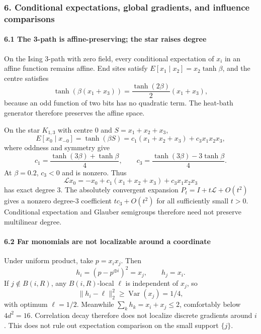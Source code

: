 \subsubsection{6. Conditional expectations, global gradients, and influence comparisons}\label{conditional-expectations-global-gradients-and-influence-comparisons}

\paragraph{6.1 The 3-path is affine-preserving; the star raises degree}\label{the-3-path-is-affine-preserving-the-star-raises-degree}

On the Ising 3-path with zero field, every conditional expectation of \(x_i\) in an affine function remains affine. End sites satisfy \(E[x_1\mid x_2]=x_2\tanh\beta\), and the centre satisfies
\[\tanh(\beta(x_1+x_3))=\frac{\tanh(2\beta)}2(x_1+x_3),\]
because an odd function of two bits has no quadratic term. The heat-bath generator therefore preserves the affine space.

On the star \(K_{1,3}\) with centre \(0\) and \(S=x_1+x_2+x_3\),
\[E[x_0\mid x_{-0}]=\tanh(\beta S)
=c_1(x_1+x_2+x_3)+c_3x_1x_2x_3,\]
where oddness and symmetry give
\[c_1=\frac{\tanh(3\beta)+\tanh\beta}{4},
\qquad
c_3=\frac{\tanh(3\beta)-3\tanh\beta}{4}.\]
At \(\beta=0.2\), \(c_3<0\) and is nonzero. Thus
\[\mathcal Lx_0=-x_0+c_1(x_1+x_2+x_3)+c_3x_1x_2x_3\]
has exact degree \(3\). The absolutely convergent expansion \(P_t=I+t\mathcal L+O(t^2)\) gives a nonzero degree-\(3\) coefficient \(tc_3+O(t^2)\) for all sufficiently small \(t>0\). Conditional expectation and Glauber semigroups therefore need not preserve multilinear degree.

\paragraph{6.2 Far monomials are not localizable around a coordinate}\label{far-monomials-are-not-localizable-around-a-coordinate}

Under uniform product, take \(p=x_ix_j\). Then
\[h_i=(p-p^{\oplus i})^2=x_j,\qquad h_j=x_i.\]
If \(j\notin B(i,R)\), any \(B(i,R)\)-local \(\ell\) is independent of \(x_j\), so
\[\|h_i-\ell\|_2^2\ge\operatorname{Var}(x_j)=1/4,\]
with optimum \(\ell=1/2\). Meanwhile \(\sum_kh_k=x_i+x_j\le2\), comfortably below \(4d^2=16\). Correlation decay therefore does not localize discrete gradients around \(i\). This does not rule out expectation comparison on the small support \(\{j\}\).

